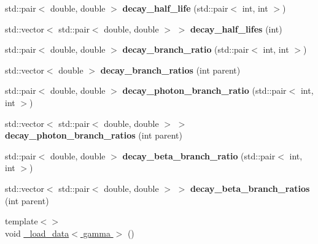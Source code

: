 \begin{DoxyCompactItemize}
\item 
std\+::pair$<$ double, double $>$ {\bfseries decay\+\_\+half\+\_\+life} (std\+::pair$<$ int, int $>$)\hypertarget{namespacepyne_acfa39b50f6a8d82e8a651df1f2802c91}{}\label{namespacepyne_acfa39b50f6a8d82e8a651df1f2802c91}

\item 
std\+::vector$<$ std\+::pair$<$ double, double $>$ $>$ {\bfseries decay\+\_\+half\+\_\+lifes} (int)\hypertarget{namespacepyne_a107db9126709d0f3ccf56f198d4270a5}{}\label{namespacepyne_a107db9126709d0f3ccf56f198d4270a5}

\item 
std\+::pair$<$ double, double $>$ {\bfseries decay\+\_\+branch\+\_\+ratio} (std\+::pair$<$ int, int $>$)\hypertarget{namespacepyne_a36c4d1c03c50dc3a1b979b740e44fdc6}{}\label{namespacepyne_a36c4d1c03c50dc3a1b979b740e44fdc6}

\item 
std\+::vector$<$ double $>$ {\bfseries decay\+\_\+branch\+\_\+ratios} (int parent)\hypertarget{namespacepyne_a14334fe7674faca75d40f5864b5fb1c1}{}\label{namespacepyne_a14334fe7674faca75d40f5864b5fb1c1}

\item 
std\+::pair$<$ double, double $>$ {\bfseries decay\+\_\+photon\+\_\+branch\+\_\+ratio} (std\+::pair$<$ int, int $>$)\hypertarget{namespacepyne_a52dacedebd3759972e8eaba92415d6a6}{}\label{namespacepyne_a52dacedebd3759972e8eaba92415d6a6}

\item 
std\+::vector$<$ std\+::pair$<$ double, double $>$ $>$ {\bfseries decay\+\_\+photon\+\_\+branch\+\_\+ratios} (int parent)\hypertarget{namespacepyne_a56c577e234113f0b8068882018072888}{}\label{namespacepyne_a56c577e234113f0b8068882018072888}

\item 
std\+::pair$<$ double, double $>$ {\bfseries decay\+\_\+beta\+\_\+branch\+\_\+ratio} (std\+::pair$<$ int, int $>$)\hypertarget{namespacepyne_a2da9236f7356b5fd67adc01777af6769}{}\label{namespacepyne_a2da9236f7356b5fd67adc01777af6769}

\item 
std\+::vector$<$ std\+::pair$<$ double, double $>$ $>$ {\bfseries decay\+\_\+beta\+\_\+branch\+\_\+ratios} (int parent)\hypertarget{namespacepyne_aef5ed08c65dbe62f9da6f7206772f7e5}{}\label{namespacepyne_aef5ed08c65dbe62f9da6f7206772f7e5}

\item 
{\footnotesize template$<$$>$ }\\void \hyperlink{namespacepyne_af3c61532d2b2c56c5f2a0c1c2777b541}{\+\_\+load\+\_\+data$<$ gamma $>$} ()\hypertarget{namespacepyne_af3c61532d2b2c56c5f2a0c1c2777b541}{}\label{namespacepyne_af3c61532d2b2c56c5f2a0c1c2777b541}


\end{DoxyCompactItemize}
